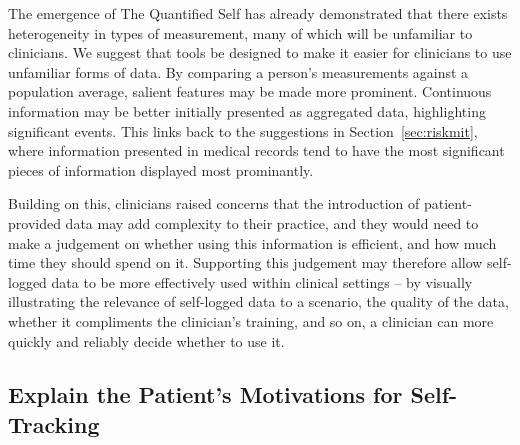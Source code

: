 \documentclass{sigchi}
\begin{document}

The emergence of The Quantified Self has already demonstrated that there exists heterogeneity in types of measurement, many of which will be unfamiliar to clinicians. We suggest that tools be designed to make it easier for clinicians to use unfamiliar forms of data. By comparing a person's measurements against a population average, salient features may be made more prominent. Continuous information may be better initially presented as aggregated data, highlighting significant events. This links back to the suggestions in Section~\ref{sec:riskmit}, where information presented in medical records tend to have the most significant pieces of information displayed most prominantly.  %

Building on this, clinicians raised concerns that the introduction of patient-provided data may add complexity to their practice, and they would need to make a judgement on whether using this information is efficient, and how much time they should spend on it. Supporting this judgement may therefore allow self-logged data to be more effectively used within clinical settings -- by visually illustrating the relevance of self-logged data to a scenario, the quality of the data, whether it compliments the clinician's training, and so on, a clinician can more quickly and reliably decide whether to use it.







\subsection{Explain the Patient's Motivations for Self-Tracking} 



\end{document}
